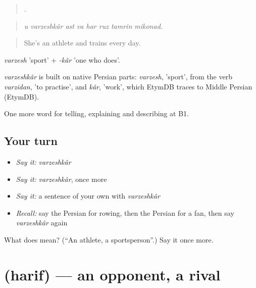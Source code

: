 \begin{quote}
       .
\end{quote}

\begin{quote}
\emph{u varzeshkâr ast va har ruz tamrin mikonad.}
\end{quote}

\begin{quote}
She's an athlete and trains every day.
\end{quote}

\emph{varzesh} 'sport' + \emph{-kâr} 'one who does'.

\begin{cousinweb}
\emph{varzeshkâr} is built on native Persian parts: \emph{varzesh}, 'sport', from the verb \emph{varzidan}, 'to practise', and \emph{kâr}, 'work', which EtymDB traces to Middle Persian (EtymDB).
\end{cousinweb}

\begin{grammarlens}[title={What you've built}]
One more word for telling, explaining and describing at B1.
\end{grammarlens}

\subsection*{Your turn}
\begin{itemize}
\raggedright
  \item \emph{Say it:} \emph{varzeshkâr}
  \item \emph{Say it:} \emph{varzeshkâr}, once more
  \item \emph{Say it:} a sentence of your own with \emph{varzeshkâr}
  \item \emph{Recall:} say the Persian for rowing, then the Persian for a fan, then say \emph{varzeshkâr} again
\end{itemize}

\begin{tcolorbox}[breakable,colback=teal!4,colframe=teal!35!black,title={Before you move on}]
What does  mean? (\textquotedblleft{}An athlete, a sportsperson\textquotedblright{}.) Say it once more.
\end{tcolorbox}
\section[\texorpdfstring{\fa{حریف} (harif)}{حریف (harif)}]{ (harif) — an opponent, a rival}

